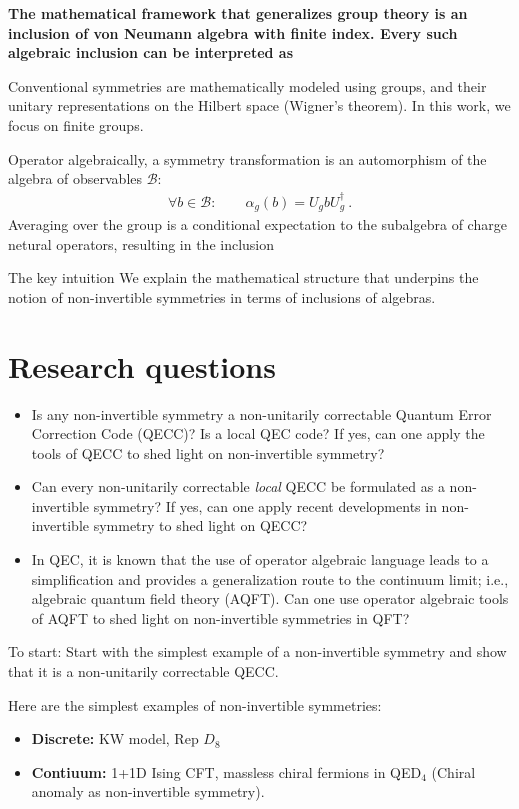 \documentclass{article}
\theoremstyle{definition}
\begin{document}
  {\bf The mathematical framework that generalizes group theory is an inclusion of von Neumann algebra with finite index. Every such algebraic inclusion can be interpreted as }

  Conventional symmetries are mathematically modeled using groups, and their unitary
  representations on the Hilbert space (Wigner's theorem). In this work, we focus
  on finite groups.

  Operator algebraically, a symmetry transformation is an automorphism of the
  algebra of observables $\mathcal{B}$:
  \begin{align}
    \forall b\in \mathcal{B}:\qquad \alpha_{g}(b)=U_{g}b U_{g}^{\dagger}\ .
  \end{align}
  Averaging over the group is a conditional expectation to the subalgebra of charge
  netural operators, resulting in the inclusion

  The key intuition We explain the mathematical structure that underpins the notion
  of non-invertible symmetries in terms of inclusions of algebras.

  \section{Research questions}

  \begin{itemize}
    \item Is any non-invertible symmetry a non-unitarily correctable Quantum Error
      Correction Code (QECC)? Is a local QEC code? If yes, can one apply the
      tools of QECC to shed light on non-invertible symmetry?

    \item Can every non-unitarily correctable {\it local} QECC be formulated as a
      non-invertible symmetry? If yes, can one apply recent developments in non-invertible
      symmetry to shed light on QECC?

    \item In QEC, it is known that the use of operator algebraic language leads
      to a simplification and provides a generalization route to the continuum
      limit; i.e., algebraic quantum field theory (AQFT). Can one use operator
      algebraic tools of AQFT to shed light on non-invertible symmetries in QFT?
  \end{itemize}
  To start: Start with the simplest example of a non-invertible symmetry and show
  that it is a non-unitarily correctable QECC.

  Here are the simplest examples of non-invertible symmetries:
  \begin{itemize}
    \item {\bf Discrete:} KW model, Rep $D_{8}$

    \item {\bf Contiuum:} 1+1D Ising CFT, massless chiral fermions in QED$_{4}$ (Chiral
      anomaly as non-invertible symmetry).
  \end{itemize}
\end{document}
